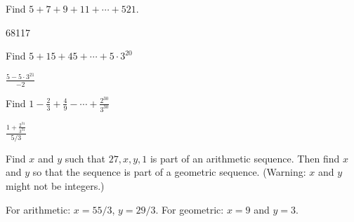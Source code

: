 \begin{questions}
	\begin{answer}
	\end{answer}
	
	
	



\question Find $5 + 7 + 9 + 11+ \cdots + 521$.

	\begin{answer}
		68117
	\end{answer}
	
	
	


\question Find $5 + 15 + 45 + \cdots + 5\cdot 3^{20}$

	\begin{answer}
		$\frac{5-5\cdot 3^{21}}{-2}$
	\end{answer}
	
	
	


\question Find $1 - \frac{2}{3} + \frac{4}{9} - \cdots + \frac{2^{30}}{3^{30}}$

	\begin{answer}
		$\frac{1 + \frac{2^{31}}{3^{31}}}{5/3}$
	\end{answer}
	
	
	


\question Find $x$ and $y$ such that $27, x, y, 1$ is part of an arithmetic sequence.  Then find $x$ and $y$ so that the sequence is part of a geometric sequence.  (Warning: $x$ and $y$ might not be integers.) 

	\begin{answer}
		For arithmetic: $x = 55/3$, $y = 29/3$.  For geometric: $x = 9$ and $y = 3$.
	\end{answer}
	
	



\end{questions}
